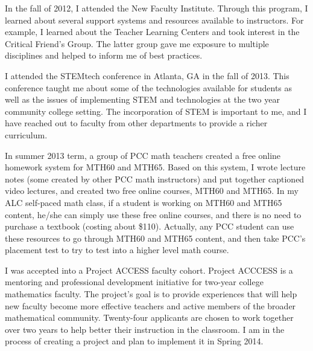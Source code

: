 \begin{description}[style=nextline]
	\item[Jon Wherry (Full-time Instructor, Rock Creek Campus)]
	In the fall of 2012, I attended the New Faculty Institute. Through this
	program, I learned about several support systems and resources available to
	instructors. For example, I learned about the Teacher Learning Centers and took
	interest in the Critical Friend's Group. The latter group gave me exposure to
	multiple disciplines and helped to inform me of best practices.

	I attended the STEMtech conference in Atlanta, GA in the fall of 2013. This
	conference taught me about some of the technologies available for students as
	well as the issues of implementing STEM and technologies at the two year
	community college setting. The incorporation of STEM is important to me, and I
	have reached out to faculty from other departments to provide a richer
	curriculum.

	\item[Carl Yao (Full-Time Instructor, Southeast Campus)]
	In summer 2013 term, a group of PCC math teachers created a free online
	homework system for MTH60 and MTH65. Based on this system, I wrote lecture
	notes (some created by other PCC math instructors) and put together captioned
	video lectures, and created two free online courses, MTH60 and MTH65.  In my
	ALC self-paced math class, if a student is working on MTH60 and MTH65 content,
	he/she can simply use these free online courses, and there is no need to
	purchase a textbook (costing about \$110).  Actually, any PCC student can use
	these resources to go through MTH60 and MTH65 content, and then take PCC's
	placement test to try to test into a higher level math course.

	\item[Stephanie Yurasits (Full-Time Instructor, Southeast Campus)]
	I was accepted into a Project ACCESS faculty cohort.  Project ACCCESS is a
	mentoring and professional development initiative for two-year college
	mathematics faculty. The project's goal is to provide experiences that will
	help new faculty become more effective teachers and active members of the
	broader mathematical community.  Twenty-four applicants are chosen to work
	together over two years to help better their instruction in the classroom.  I
	am in the process of creating a project and plan to implement it in Spring
	2014.
\end{description}
